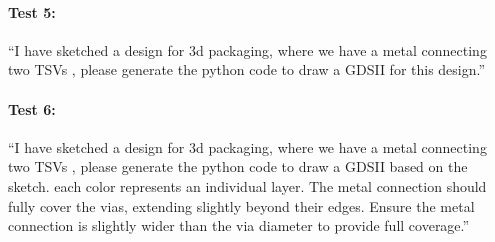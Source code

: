 \documentclass{article}
\begin{document}
\paragraph{Test 5:} ``I have sketched a design for 3d packaging, where we have a metal connecting two TSVs , please generate the python code to draw a GDSII for this design.''

\paragraph{Test 6:} ``I have sketched a design for 3d packaging, where we have a metal connecting two TSVs , please generate the python code to draw a GDSII based on the sketch. each color represents an individual layer. The metal connection should fully cover the vias, extending slightly beyond their edges. Ensure the metal connection is slightly wider than the via diameter to provide full coverage.''


\end{document}
